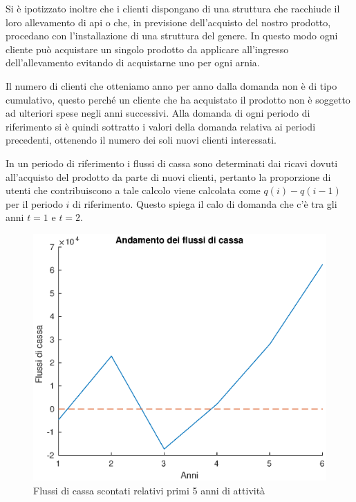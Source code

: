 Si è ipotizzato inoltre che i clienti dispongano di una struttura che
racchiude il loro allevamento di api o che, in previsione dell’acquisto del
nostro prodotto, procedano con l’installazione di una struttura del genere. In
questo modo ogni cliente può acquistare un singolo prodotto da applicare
all’ingresso dell’allevamento evitando di acquistarne uno per ogni arnia.

Il numero di clienti che otteniamo anno per anno dalla domanda non è di tipo
cumulativo, questo perché un cliente che ha acquistato il prodotto non
è soggetto ad ulteriori spese negli anni successivi. Alla domanda di ogni
periodo di riferimento si è quindi sottratto i valori della domanda relativa ai
periodi precedenti, ottenendo il numero dei soli nuovi clienti interessati.

In un periodo di riferimento i flussi di cassa sono determinati dai ricavi
dovuti all’acquisto del prodotto da parte di nuovi clienti, pertanto la
proporzione di utenti che contribuiscono a tale calcolo viene calcolata come
$q(i) - q(i-1)$ per il periodo $i$ di riferimento. Questo spiega il calo di
domanda che c’è tra gli anni $t=1$ e $t=2$.


%
\begin{figure}[!h]
\centering
\includegraphics[width=\textwidth]{figures/cf}
\caption{Flussi di cassa scontati relativi primi 5 anni di attività}
\label{cf}
\end{figure}
%
